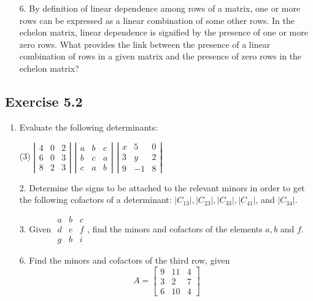 \documentclass{./../../Latex/homework}
\begin{document}
\begin{enumerate}
\item[6.] By definition of linear dependence among rows of a matrix, one or more rows can be expressed as a linear combination of some other rows. In the echelon matrix, linear dependence is signified by the presence of one or more zero rows. What provides the link between the presence of a linear combination of rows in a given matrix and the presence of zero rows in the echelon matrix?

\end{enumerate}

\subsection*{Exercise 5.2}

\begin{enumerate}

\item Evaluate the following determinants: 
\begin{tasks}(3)
\task[(c)] $\left|\begin{array}{lll}4 & 0 & 2 \\ 6 & 0 & 3 \\ 8 & 2 & 3\end{array}\right|$
\task[(e)] $\left|\begin{array}{lll}a & b & c \\ b & c & a \\ c & a & b\end{array}\right|$
\task[(f)] $\left|\begin{array}{rrr}x & 5 & 0 \\ 3 & y & 2 \\ 9 & -1 & 8\end{array}\right|$
\end{tasks}

\item[2.] Determine the signs to be attached to the relevant minors in order to get the following cofactors of a determinant: $|C_{13}|,|C_{23}|, |C_{33}|,|C_{41}|$, and $|C_{34}|$.

\item[3.] Given $ \begin{array}{|lll|}a & b & c \\ d & e & f \\ g & b & i\end{array}$, find the minors and cofactors of the elements $a, b$ and $f$.

\item[6.] Find the minors and cofactors of the third row, given
$$
A=\left[\begin{array}{rrr}
9 & 11 & 4 \\
3 & 2 & 7 \\
6 & 10 & 4
\end{array}\right]
$$

\end{enumerate}
\end{document}
